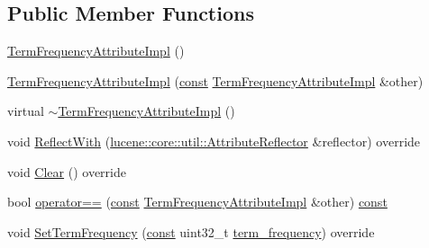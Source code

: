 \subsection*{Public Member Functions}
\begin{DoxyCompactItemize}
\item 
\mbox{\hyperlink{classlucene_1_1core_1_1analysis_1_1tokenattributes_1_1TermFrequencyAttributeImpl_aeda77a35eb6567e63179774e10c1d486}{Term\+Frequency\+Attribute\+Impl}} ()
\item 
\mbox{\hyperlink{classlucene_1_1core_1_1analysis_1_1tokenattributes_1_1TermFrequencyAttributeImpl_a624ed9c4181bde8cca574e75296cde79}{Term\+Frequency\+Attribute\+Impl}} (\mbox{\hyperlink{ZlibCrc32_8h_a2c212835823e3c54a8ab6d95c652660e}{const}} \mbox{\hyperlink{classlucene_1_1core_1_1analysis_1_1tokenattributes_1_1TermFrequencyAttributeImpl}{Term\+Frequency\+Attribute\+Impl}} \&other)
\item 
virtual \mbox{\hyperlink{classlucene_1_1core_1_1analysis_1_1tokenattributes_1_1TermFrequencyAttributeImpl_ad294177d45b1697153b141eddcdecd50}{$\sim$\+Term\+Frequency\+Attribute\+Impl}} ()
\item 
void \mbox{\hyperlink{classlucene_1_1core_1_1analysis_1_1tokenattributes_1_1TermFrequencyAttributeImpl_aef08e2be7b9a57329ed5df12fcb2a9d9}{Reflect\+With}} (\mbox{\hyperlink{namespacelucene_1_1core_1_1util_a7dbb701adaed055f73fb95eec83da10a}{lucene\+::core\+::util\+::\+Attribute\+Reflector}} \&reflector) override
\item 
void \mbox{\hyperlink{classlucene_1_1core_1_1analysis_1_1tokenattributes_1_1TermFrequencyAttributeImpl_aaa575565a7b466b6bdcf4d8042f3f582}{Clear}} () override
\item 
bool \mbox{\hyperlink{classlucene_1_1core_1_1analysis_1_1tokenattributes_1_1TermFrequencyAttributeImpl_aa49e2039c1274b9182bce2c23d52c806}{operator==}} (\mbox{\hyperlink{ZlibCrc32_8h_a2c212835823e3c54a8ab6d95c652660e}{const}} \mbox{\hyperlink{classlucene_1_1core_1_1analysis_1_1tokenattributes_1_1TermFrequencyAttributeImpl}{Term\+Frequency\+Attribute\+Impl}} \&other) \mbox{\hyperlink{ZlibCrc32_8h_a2c212835823e3c54a8ab6d95c652660e}{const}}
\item 
void \mbox{\hyperlink{classlucene_1_1core_1_1analysis_1_1tokenattributes_1_1TermFrequencyAttributeImpl_a7662b5bc48f8914a3df96ea22b742e5f}{Set\+Term\+Frequency}} (\mbox{\hyperlink{ZlibCrc32_8h_a2c212835823e3c54a8ab6d95c652660e}{const}} uint32\+\_\+t \mbox{\hyperlink{classlucene_1_1core_1_1analysis_1_1tokenattributes_1_1TermFrequencyAttributeImpl_a94d743632e8edd5e9e05ce039eec16e8}{term\+\_\+frequency}}) override

\end{DoxyCompactItemize}

